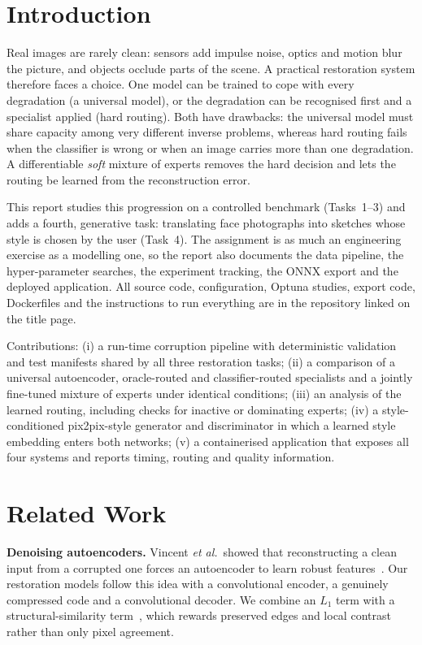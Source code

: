 \documentclass[conference]{IEEEtran}
\begin{document}
\section{Introduction}
Real images are rarely clean: sensors add impulse noise, optics and motion blur the picture, and objects occlude parts of the scene. A
practical restoration system therefore faces a choice. One model can be trained to cope with every degradation (a universal model), or the
degradation can be recognised first and a specialist applied (hard routing). Both have drawbacks: the universal model must share
capacity among very different inverse problems, whereas hard routing fails when the classifier is wrong or when an image carries more than one degradation.
A differentiable \emph{soft} mixture of experts removes the hard decision and lets the routing be learned from the reconstruction error.

This report studies this progression on a controlled benchmark (Tasks~1--3) and adds a fourth, generative task: translating face photographs into
sketches whose style is chosen by the user (Task~4). The assignment is as much an engineering exercise as a modelling one, so the
report also documents the data pipeline, the hyper-parameter searches, the experiment tracking, the ONNX export and the deployed application.
All source code, configuration, Optuna studies, export code, Dockerfiles and the instructions to run everything are in the repository
linked on the title page.

Contributions: (i) a run-time corruption pipeline with deterministic validation and test manifests shared by all three restoration tasks;
(ii) a comparison of a universal autoencoder, oracle-routed and classifier-routed specialists and a jointly fine-tuned mixture of experts under identical conditions;
(iii) an analysis of the learned routing, including checks for inactive or dominating experts;
(iv) a style-conditioned pix2pix-style generator and discriminator in which a learned style embedding enters both networks;
(v) a containerised application that exposes all four systems and reports timing, routing and quality information.

\section{Related Work}
\textbf{Denoising autoencoders.} Vincent \emph{et al.}\ showed that reconstructing a clean input from a corrupted one forces an autoencoder to learn robust
features~\cite{vincent2008}. Our restoration models follow this idea with a convolutional encoder, a genuinely compressed code and a convolutional decoder.
We combine an $L_1$ term with a structural-similarity term~\cite{wang2004}, which rewards preserved edges and local contrast rather than only pixel agreement.
\end{document}
